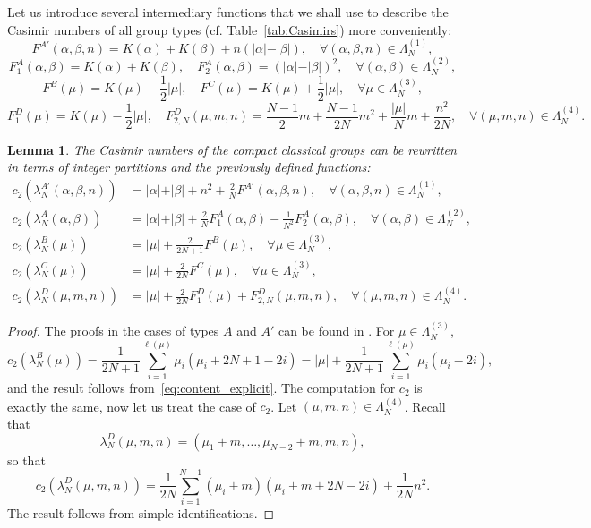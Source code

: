 \documentclass[11pt,a4paper,reqno]{article}
\newtheorem{lemma}[theorem]{Lemma}
\theoremstyle{definition}
\theoremstyle{remark}
\begin{document}
Let us introduce several intermediary functions that we shall use to describe the Casimir numbers of all group types (cf. Table~\ref{tab:Casimirs}) more conveniently:
\[
F^{A'}(\alpha,\beta,n)=K(\alpha)+K(\beta)+n(\vert\alpha\vert-\vert\beta\vert),\quad \forall(\alpha,\beta,n)\in\Lambda_N^{(1)},
\]
\[
F_1^{A}(\alpha,\beta)=K(\alpha)+K(\beta),\quad F_2^A(\alpha,\beta)=(\vert\alpha\vert-\vert\beta\vert)^2,\quad \forall (\alpha,\beta)\in\Lambda_N^{(2)},
\]
\[
F^B(\mu)=K(\mu)-\frac12\vert\mu\vert,\quad  F^C(\mu)=K(\mu)+\frac12\vert\mu\vert,\quad \forall \mu\in\Lambda_N^{(3)},
\]
\[
F_1^D(\mu)=K(\mu)-\frac12\vert \mu\vert,\quad  F_{2,N}^D(\mu,m,n)=\frac{N-1}{2}m+\frac{N-1}{2N}m^2+\frac{\vert\mu\vert}{N}m+\frac{n^2}{2N},\quad \forall (\mu,m,n)\in\Lambda_N^{(4)}.
\]
\begin{lemma}\label{lem:casimirs}
The Casimir numbers of the compact classical groups can be rewritten in terms of integer partitions and the previously defined functions:
\begin{align*}
c_2(\lambda_N^{A'}(\alpha,\beta,n))&=  \vert\alpha\vert+\vert\beta\vert+n^2+\frac{2}{N}F^{A'}(\alpha,\beta,n),\quad \forall (\alpha,\beta,n)\in\Lambda_N^{(1)},\\
c_2(\lambda_N^A(\alpha,\beta))&=  \vert\alpha\vert+\vert\beta\vert+\frac{2}{N}F_1^A(\alpha,\beta)-\frac{1}{N^2}F_2^A(\alpha,\beta),\quad \forall(\alpha,\beta)\in\Lambda_N^{(2)},\\
c_2(\lambda_N^B(\mu))&=  \vert\mu\vert+\frac{2}{2N+1}F^B(\mu),\quad \forall\mu\in\Lambda_N^{(3)},\\
c_2(\lambda_N^C(\mu))&=\vert\mu\vert+\frac{2}{2N}F^C(\mu),\quad\forall\mu\in\Lambda_N^{(3)},\\
c_2(\lambda_N^D(\mu,m,n))&=\vert\mu\vert+\frac{2}{2N}F_1^D(\mu) +F_{2,N}^D(\mu,m,n),\quad \forall (\mu,m,n)\in\Lambda_N^{(4)}.
\end{align*}

\end{lemma}

\begin{proof}
The proofs in the cases of types $A$ and $A'$ can be found in \cite{Lem}. For $\mu\in\Lambda_N^{(3)}$,
\[
c_2(\lambda_N^B(\mu))=\frac{1}{2N+1}\sum_{i=1}^{\ell(\mu)}\mu_i(\mu_i+2N+1-2i)=\vert\mu\vert + \frac{1}{2N+1}\sum_{i=1}^{\ell(\mu)}\mu_i(\mu_i-2i),
\]
and the result follows from~\eqref{eq:content_explicit}. The computation for $c_2$ is exactly the same, now let us treat the case of $c_2$. Let $(\mu,m,n)\in\Lambda_N^{(4)}$. Recall that
\[
\lambda_N^D(\mu,m,n)=(\mu_1+m,\ldots,\mu_{N-2}+m,m,n),
\]
so that
\[
c_2(\lambda_N^D(\mu,m,n))=\frac{1}{2N}\sum_{i=1}^{N-1}(\mu_i+m)(\mu_i+m+2N-2i) + \frac{1}{2N}n^2.
\]
The result follows from simple identifications.
\end{proof}
\end{document}
